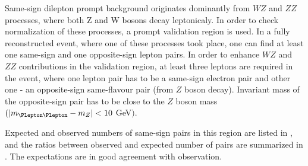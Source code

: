 Same-sign dilepton prompt background originates dominantly from $WZ$ and $ZZ$ processes, where both Z and W bosons decay leptonicaly.
In order to check normalization of these processes, a prompt validation region is used.
In a fully reconstructed event, where one of these processes took place, one can find at least one same-sign and one opposite-sign lepton pairs.
In order to enhance $WZ$ and $ZZ$ contributions in the validation region, at least three leptons are required in the event, where one lepton pair
has to be a same-sign electron pair and other one - an opposite-sign same-flavour pair (from $Z$ boson decay). 
Invariant mass of the opposite-sign pair has to be close to the $Z$ boson mass $(|m_{\Plepton\Plepton} - m_{Z}| < 10$ GeV$)$.

Expected and observed numbers of same-sign pairs in this region are listed in , 
and the ratios between observed and expected number of pairs are summarized in . 
The expectations are in good agreement with observation.

\begin{table*}[htbp]
\begin{center}
\end{center}
\caption{Expected and observed numbers of pairs for various cuts on the dilepton invariant mass. The uncertainties shown are the quadratic sum of the statistical and systematic uncertainties.}
\label{tab:promptCR_yields}
\end{table*}



